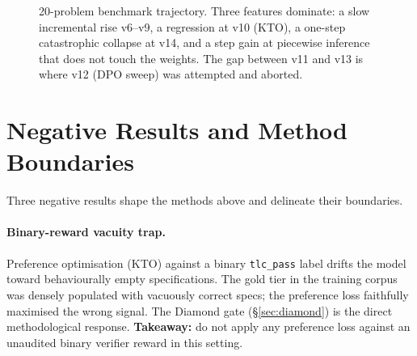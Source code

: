 \documentclass[11pt]{article}
\begin{document}
\begin{figure}[t]
\centering
{}
\caption{20-problem benchmark trajectory.  Three features dominate: a
slow incremental rise v6--v9, a regression at v10 (KTO), a
one-step catastrophic collapse at v14, and a step gain at piecewise
inference that does not touch the weights.  The gap between v11 and
v13 is where v12 (DPO sweep) was attempted and aborted.}
\label{fig:traj}
\end{figure}

\section{Negative Results and Method Boundaries}
\label{sec:negatives}

Three negative results shape the methods above and delineate
their boundaries.

\paragraph{Binary-reward vacuity trap.} Preference optimisation
(KTO) against a binary \texttt{tlc\_pass} label drifts the model
toward behaviourally empty specifications. The gold tier in the
training corpus was densely populated with vacuously correct specs;
the preference loss faithfully maximised the wrong signal. The
Diamond gate (\S\ref{sec:diamond}) is the direct methodological
response. \textbf{Takeaway:} do not apply any preference loss
against an unaudited binary verifier reward in this setting.
\end{document}
